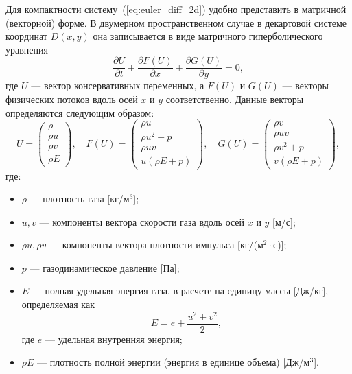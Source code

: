 \documentclass[a4paper,14pt]{extarticle}
\theoremstyle{theorem}
\theoremstyle{lemma}
\begin{document}
Для компактности систему~(\ref{eq:euler_diff_2d}) удобно представить в матричной (векторной) форме. В двумерном пространственном случае в декартовой системе координат $D(x, y)$ она записывается в виде матричного гиперболического уравнения
    \begin{equation}
    \label{eq:euler_2d}
    \frac{\partial U}{\partial t} + \frac{\partial F(U)}{\partial x} + \frac{\partial G(U)}{\partial y} = 0,
    \end{equation}
    где $U$ — вектор консервативных переменных, а $F(U)$ и $G(U)$ — векторы физических потоков вдоль осей $x$ и $y$ соответственно. Данные векторы определяются следующим образом:
    \begin{equation}
    \label{eq:vectors_2d}
    U = 
    \begin{pmatrix} 
    \rho \\ 
    \rho u \\ 
    \rho v \\
    \rho E 
    \end{pmatrix}, \quad 
    F(U) = 
    \begin{pmatrix} 
    \rho u \\ 
    \rho u^2 + p \\ 
    \rho u v \\
    u(\rho E + p) 
    \end{pmatrix}, \quad
    G(U) = 
    \begin{pmatrix} 
    \rho v \\ 
    \rho u v \\ 
    \rho v^2 + p \\
    v(\rho E + p) 
    \end{pmatrix},
    \end{equation}
    где:
    \begin{itemize}
        \item $\rho$ — плотность газа [кг/м$^3$];
        \item $u, v$ — компоненты вектора скорости газа вдоль осей $x$ и $y$ [м/с];
        \item $\rho u, \rho v$ — компоненты вектора плотности импульса [кг/(м$^2\cdot$с)];
        \item $p$ — газодинамическое давление [Па];
        \item $E$ — полная удельная энергия газа, в расчете на единицу массы [Дж/кг], определяемая как 
        \begin{equation}
            E = e + \frac{u^2 + v^2}{2},
        \end{equation} 
        где $e$ — удельная внутренняя энергия;
        \item $\rho E$ — плотность полной энергии (энергия в единице объема) [Дж/м$^3$].
    \end{itemize}
    
\end{document}
